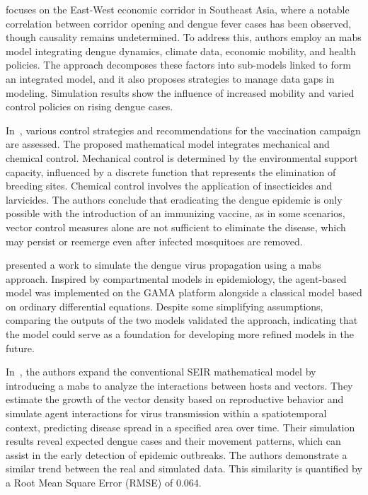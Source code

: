 \cite{damien:2017} focuses on the East-West economic corridor in Southeast
Asia, where a notable correlation between corridor opening and dengue fever
cases has been observed, though causality remains undetermined. To address this,
authors employ an \gls{mabs} model integrating dengue dynamics, climate data,
economic mobility, and health policies. The approach decomposes these factors
into sub-models linked to form an integrated model, and it also proposes
strategies to manage data gaps in modeling. Simulation results show the
influence of increased mobility and varied control policies on rising dengue
cases.

In~\cite{Carvalho2019}, various control strategies and recommendations for the
vaccination campaign are assessed. The proposed mathematical model integrates
mechanical and chemical control. Mechanical control is determined by the
environmental support capacity, influenced by a discrete function that
represents the elimination of breeding sites. Chemical control involves the
application of insecticides and larvicides. The authors conclude that
eradicating the dengue epidemic is only possible with the introduction of an
immunizing vaccine, as in some scenarios, vector control measures alone are not
sufficient to eliminate the disease, which may persist or reemerge even after
infected mosquitoes are removed.


\cite{da-silva:2020} presented a work to simulate the dengue virus propagation
using a \gls{mabs} approach. Inspired by compartmental models in epidemiology,
the agent-based model was implemented on the GAMA platform alongside a classical
model based on ordinary differential equations. Despite some simplifying
assumptions, comparing the outputs of the two models validated the approach,
indicating that the model could serve as a foundation for developing more
refined models in the future.

In~\cite{Imran2020}, the authors expand the conventional SEIR mathematical model
by introducing a \gls{mabs} to analyze the interactions between hosts and
vectors. They estimate the growth of the vector density based on reproductive
behavior and simulate agent interactions for virus transmission within a
spatiotemporal context, predicting disease spread in a specified area over time.
Their simulation results reveal expected dengue cases and their movement
patterns, which can assist in the early detection of epidemic outbreaks. The
authors demonstrate a similar trend between the real and simulated data. This
similarity is quantified by a Root Mean Square Error (RMSE) of 0.064.

